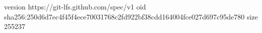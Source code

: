 version https://git-lfs.github.com/spec/v1
oid sha256:250d6d7ec4f45f4ece70031768c2fd922bf38cdd164004fce027d697c95de780
size 255237
